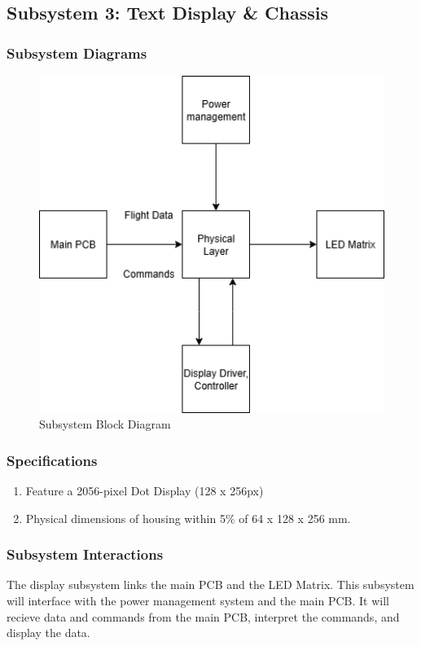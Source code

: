 \subsection{Subsystem 3: Text Display \& Chassis}

\subsubsection{Subsystem Diagrams}
\begin{figure}[h]
    \centering
    \includegraphics[width=12cm]{images/blockDiagram-display.png} %
    \caption{Subsystem Block Diagram}
\end{figure} %

\subsubsection{Specifications}
\begin{enumerate}
    \item Feature a 2056-pixel Dot Display (128 x 256px)
    \item Physical dimensions of housing within 5\% of 64 x 128 x 256 mm.
\end{enumerate}

\subsubsection{Subsystem Interactions}
The display subsystem links the main PCB and the LED Matrix. This subsystem will interface with the power management system and the main PCB. It will recieve data and commands from the main PCB, interpret the commands, and display the data.

